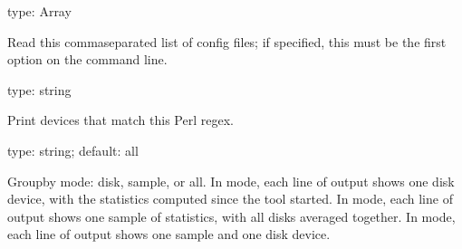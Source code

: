 \documentclass[letterpaper,10pt,english]{sphinxmanual}
\begin{document}
\begin{fulllineitems}
\label{\detokenize{mariadb-iostat:cmdoption-mariadb-iostat-config}}
type: Array

Read this comma\sphinxhyphen{}separated list of config files; if specified, this must be the
first option on the command line.

\end{fulllineitems}


\begin{fulllineitems}
\label{\detokenize{mariadb-iostat:cmdoption-mariadb-iostat-devices-regex}}
type: string

Print devices that match this Perl regex.

\end{fulllineitems}


\begin{fulllineitems}
\label{\detokenize{mariadb-iostat:cmdoption-mariadb-iostat-group-by}}
type: string; default: all

Group\sphinxhyphen{}by mode: disk, sample, or all.  In  mode, each line of output
shows one disk device, with the statistics computed since the tool started.  In
 mode, each line of output shows one sample of statistics, with all
disks averaged together.  In  mode, each line of output shows one sample
and one disk device.

\end{fulllineitems}
\end{document}
